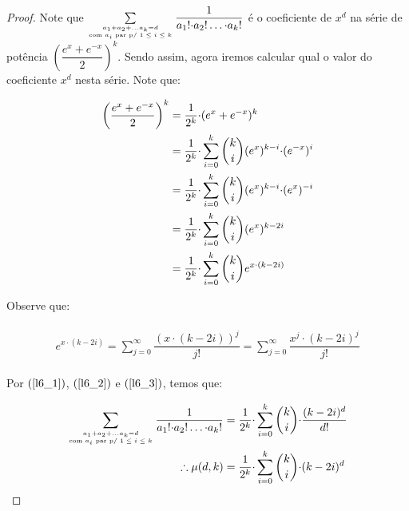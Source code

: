 \documentclass[12pt]{article}
\begin{document}
{\begin{proof}
 
 Note que $\sum\limits_{a_1 + a_2 + \ldots a_k = d \atop \text{com $a_i$ par p/ $1 \leq i \leq k$}} \dfrac{1}{a_1! {\cdot} a_2! \ldots {\cdot} a_k!}$ é o coeficiente de $x^{d}$ na série de potência $\left(\dfrac{e^x + e^{-x}}{2}\right)^k$. Sendo assim, agora iremos calcular qual o valor do coeficiente $x^{d}$ nesta série. Note que:
 
 \begin{align}
 	\begin{split}
 		\label{l6_2}
 		\left(\dfrac{e^x + e^{-x}}{2}\right)^k &= \dfrac{1}{2^k} {\cdot} (e^x + e^{-x})^k \\
 		&= \dfrac{1}{2^k} {\cdot} \sum\limits_{i = 0}^{k}\escolhe{k}{i}(e^x)^{k-i} {\cdot} (e^{-x})^i \\
 		&= \dfrac{1}{2^k} {\cdot} \sum\limits_{i = 0}^{k}\escolhe{k}{i}(e^x)^{k-i} {\cdot} (e^{x})^{-i} \\
 		&= \dfrac{1}{2^k} {\cdot} \sum\limits_{i = 0}^{k}\escolhe{k}{i}(e^x)^{k-2i}  \\
 		&= \dfrac{1}{2^k} {\cdot} \sum\limits_{i = 0}^{k}\escolhe{k}{i}e^{x {\cdot}(k - 2i)}
 	\end{split} 
 \end{align}
 
 Observe que:
 
  \begin{align}
 	\begin{split}
 		\label{l6_3}
 		e^{x {\cdot}(k - 2i)} = \sum\limits_{j = 0}^{\infty} \dfrac{(x {\cdot}(k - 2i))^j}{j!} = \sum\limits_{j = 0}^{\infty} \dfrac{x^j {\cdot}(k - 2i)^j}{j!}
 	\end{split} 
 \end{align}
 
 Por $(\ref{l6_1})$, $(\ref{l6_2})$ e $(\ref{l6_3})$, temos que:
 
  \begin{align}
 	\begin{split} 
 		\sum\limits_{a_1 + a_2 + \ldots a_k = d \atop \text{com $a_i$ par p/ $1 \leq i \leq k$}} \dfrac{1}{a_1! {\cdot} a_2! \ldots {\cdot} a_k!} &= \dfrac{1}{2^k} {\cdot} \sum\limits_{i = 0}^{k}\escolhe{k}{i} {\cdot} \dfrac{(k - 2i)^{d}}{d!} \\
 		\therefore \mu(d, k) &= \dfrac{1}{2^k} {\cdot} \sum\limits_{i = 0}^{k}\escolhe{k}{i} {\cdot} (k - 2i)^{d}
 	\end{split} 
 \end{align}
 
 \end{proof}
 
}
\end{document}
